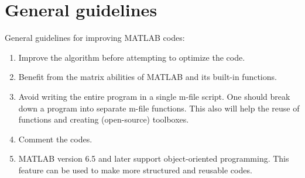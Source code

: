 \documentclass[10pt,a4paper]{article}
\begin{document}
\section{General guidelines}
\label{sec:general}
General guidelines for improving MATLAB codes:
\begin{enumerate}
\item Improve the algorithm before attempting to optimize the code.
\item Benefit from the matrix abilities of MATLAB and its built-in functions.
\item Avoid writing the entire program in a single m-file script. One should break down a program into separate m-file functions. This also will help the reuse of functions and creating (open-source) toolboxes. 
\item Comment the codes.
\item MATLAB version 6.5 and later support object-oriented programming. This feature can be used to make more structured and reusable codes.
\end{enumerate}

\end{document}
